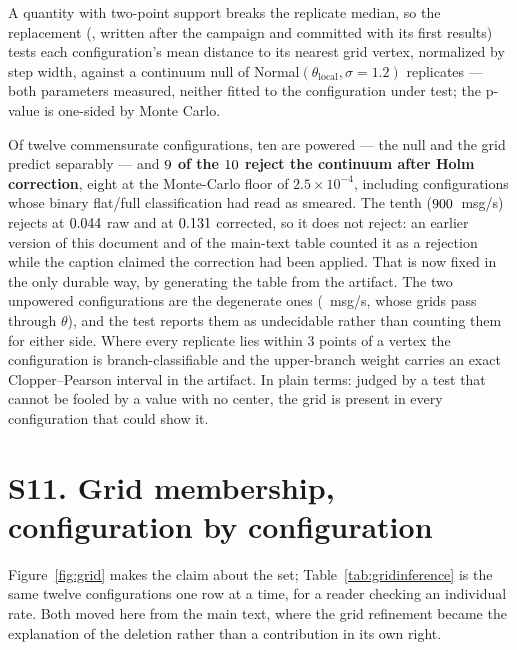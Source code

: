 \documentclass[10pt,journal,onecolumn]{IEEEtran}
\begin{document}
A quantity with two-point support breaks the replicate median, so the replacement
(, written after the campaign and committed with its first
results) tests each
configuration's mean distance to its nearest grid vertex, normalized by step width, against a
continuum null of Normal$(\theta_{\mathrm{local}}, \sigma{=}1.2)$ replicates --- both
parameters measured, neither fitted to the configuration under test; the p-value is one-sided by
Monte Carlo.

Of twelve commensurate configurations, ten are powered --- the null and the grid predict separably --- and
\textbf{$9$ of the $10$ reject the continuum after Holm correction},
eight at the Monte-Carlo floor of
$2.5\times10^{-4}$, including configurations whose binary flat/full classification had read as smeared.
The tenth ($900$~msg/s) rejects at $0.044$ raw and at
$0.131$ corrected, so it does not reject: an earlier version of this document
and of the main-text table counted it as a rejection while the caption claimed the
correction had been applied. That is now fixed in the only durable way, by generating the
table from the artifact. The two unpowered configurations are the degenerate ones
(\gridFlatRates~msg/s, whose grids pass through $\theta$), and the test reports them as
undecidable rather than counting them for either side. Where every replicate lies within $3$
points of a vertex the configuration is branch-classifiable and the upper-branch weight carries an exact
Clopper--Pearson interval in the artifact. In plain terms: judged by a test that cannot be
fooled by a value with no center, the grid is present in every configuration that could show it.

\section{S11. Grid membership, configuration by configuration}
\label{sec:gridtable}

Figure~\ref{fig:grid} makes the claim about the set; Table~\ref{tab:gridinference} is the
same twelve configurations one row at a time, for a reader checking an individual rate. Both
moved here from the main text, where the grid refinement became the explanation of
the deletion rather than a contribution in its own right.
\end{document}
